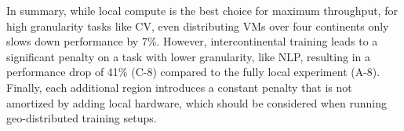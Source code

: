In summary, while local compute is the best choice for maximum throughput, for high granularity tasks like CV, even distributing VMs over four continents only slows down performance by 7\%.
However, intercontinental training leads to a significant penalty on a task with lower granularity, like NLP, resulting in a performance drop of 41\% (C-8) compared to the fully local experiment (A-8).
Finally, each additional region introduces a constant penalty that is not amortized by adding local hardware, which should be considered when running geo-distributed training setups.